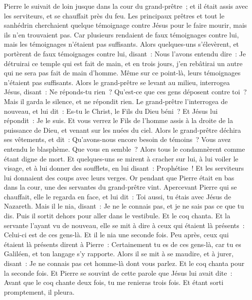 \begin{multicols}{2}
Pierre le suivait de loin jusque dans la cour du grand-prêtre~; et il était assis avec les serviteurs, et se chauffait près du feu.
Les principaux prêtres et tout le sanhédrin cherchaient quelque témoignage contre Jésus pour le faire mourir, mais ils n'en trouvaient pas.
Car plusieurs rendaient de faux témoignages contre lui, mais les témoignages n'étaient pas suffisants.
Alors quelques-uns s'élevèrent, et portèrent de faux témoignages contre lui, disant~:
Nous l'avons entendu dire~: Je détruirai ce temple qui est fait de main, et en trois jours, j'en rebâtirai un autre qui ne sera pas fait de main d'homme.
Même sur ce point-là, leurs témoignages n'étaient pas suffisants.
Alors le grand-prêtre se levant au milieu, interrogea Jésus, disant~: Ne réponds-tu rien~? Qu'est-ce que ces gens déposent contre toi~?
Mais il garda le silence, et ne répondit rien. Le grand-prêtre l'interrogea de nouveau, et lui dit~: Es-tu le Christ, le Fils du Dieu béni~?
Et Jésus lui répondit~: Je le suis. Et vous verrez le Fils de l'homme assis à la droite de la puissance de Dieu, et venant sur les nuées du ciel.
Alors le grand-prêtre déchira ses vêtements, et dit~: Qu'avons-nous encore besoin de témoins~?
Vous avez entendu le blasphème. Que vous en semble~? Alors tous le condamnèrent comme étant digne de mort.
Et quelques-uns se mirent à cracher sur lui, à lui voiler le visage, et à lui donner des soufflets, en lui disant~: Prophétise~! Et les serviteurs lui donnaient des coups avec leurs verges.
Or pendant que Pierre était en bas dans la cour, une des servantes du grand-prêtre vint.
Apercevant Pierre qui se chauffait, elle le regarda en face, et lui dit~: Toi aussi, tu étais avec Jésus de Nazareth.
Mais il le nia, disant~: Je ne le connais pas, et je ne sais pas ce que tu dis. Puis il sortit dehors pour aller dans le vestibule. Et le coq chanta.
Et la servante l'ayant vu de nouveau, elle se mit à dire à ceux qui étaient là présents~: Celui-ci est de ces gens-là. Et il le nia une seconde fois.
Peu après, ceux qui étaient là présents dirent à Pierre~: Certainement tu es de ces gens-là, car tu es Galiléen, et ton langage s'y rapporte.
Alors il se mit à se maudire, et à jurer, disant~: Je ne connais pas cet homme-là dont vous parlez.
Et le coq chanta pour la seconde fois. Et Pierre se souvint de cette parole que Jésus lui avait dite~: Avant que le coq chante deux fois, tu me renieras trois fois. Et étant sorti promptement, il pleura.

\end{multicols}
